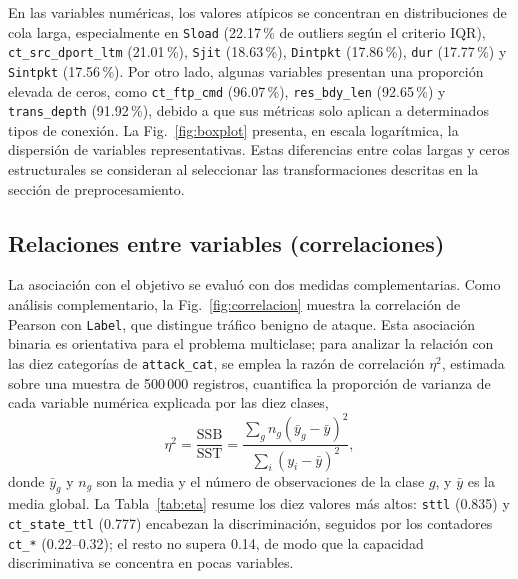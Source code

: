 \documentclass[conference]{IEEEtran}
\begin{document}
En las variables numéricas, los valores atípicos se concentran en distribuciones de cola larga, especialmente en \texttt{Sload} (22.17\,\% de outliers según el criterio IQR), \texttt{ct\_src\_dport\_ltm} (21.01\,\%), \texttt{Sjit} (18.63\,\%), \texttt{Dintpkt} (17.86\,\%), \texttt{dur} (17.77\,\%) y \texttt{Sintpkt} (17.56\,\%). Por otro lado, algunas variables presentan una proporción elevada de ceros, como \texttt{ct\_ftp\_cmd} (96.07\,\%), \texttt{res\_bdy\_len} (92.65\,\%) y \texttt{trans\_depth} (91.92\,\%), debido a que sus métricas solo aplican a determinados tipos de conexión. La Fig.~\ref{fig:boxplot} presenta, en escala logarítmica, la dispersión de variables representativas. Estas diferencias entre colas largas y ceros estructurales se consideran al seleccionar las transformaciones descritas en la sección de preprocesamiento.
\subsection{Relaciones entre variables (correlaciones)}

La asociación con el objetivo se evaluó con dos medidas complementarias. Como análisis complementario, la Fig.~\ref{fig:correlacion} muestra la correlación de Pearson con \texttt{Label}, que distingue tráfico benigno de ataque. Esta asociación binaria es orientativa para el problema multiclase; para analizar la relación con las diez categorías de \texttt{attack\_cat}, se emplea la razón de correlación $\eta^2$, estimada sobre una muestra de 500\,000 registros, cuantifica la proporción de varianza de cada variable numérica explicada por las diez clases,
\begin{equation}
    \eta^{2} = \frac{\mathrm{SSB}}{\mathrm{SST}} = \frac{\sum_{g} n_{g}(\bar{y}_{g} - \bar{y})^{2}}{\sum_{i} (y_{i} - \bar{y})^{2}},
\end{equation}
donde $\bar{y}_{g}$ y $n_{g}$ son la media y el número de observaciones de la clase $g$, y $\bar{y}$ es la media global. La Tabla~\ref{tab:eta} resume los diez valores más altos: \texttt{sttl} (0.835) y \texttt{ct\_state\_ttl} (0.777) encabezan la discriminación, seguidos por los contadores \texttt{ct\_*} (0.22--0.32); el resto no supera 0.14, de modo que la capacidad discriminativa se concentra en pocas variables.
\end{document}
